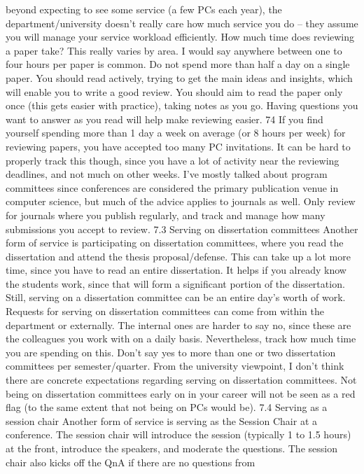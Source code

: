 \documentclass[oneside,11pt]{memoir}
\begin{document}
beyond expecting to see some service (a few PCs each year), the department/university doesn’t
really care how much service you do – they assume you will manage your service workload
efficiently.
How much time does reviewing a paper take? This really varies by area. I would say anywhere
between one to four hours per paper is common. Do not spend more than half a day on a single
paper. You should read actively, trying to get the main ideas and insights, which will enable you
to write a good review. You should aim to read the paper only once (this gets easier with
practice), taking notes as you go. Having questions you want to answer as you read will help
make reviewing easier.
74
If you find yourself spending more than 1 day a week on average (or 8 hours per week) for
reviewing papers, you have accepted too many PC invitations. It can be hard to properly track
this though, since you have a lot of activity near the reviewing deadlines, and not much on other
weeks.
I’ve mostly talked about program committees since conferences are considered the primary
publication venue in computer science, but much of the advice applies to journals as well. Only
review for journals where you publish regularly, and track and manage how many submissions
you accept to review.
7.3 Serving on dissertation committees
Another form of service is participating on dissertation committees, where you read the
dissertation and attend the thesis proposal/defense. This can take up a lot more time, since you
have to read an entire dissertation. It helps if you already know the students work, since that
will form a significant portion of the dissertation. Still, serving on a dissertation committee can
be an entire day’s worth of work.
Requests for serving on dissertation committees can come from within the department or
externally. The internal ones are harder to say no, since these are the colleagues you work with
on a daily basis. Nevertheless, track how much time you are spending on this. Don’t say yes to
more than one or two dissertation committees per semester/quarter.
From the university viewpoint, I don’t think there are concrete expectations regarding serving on
dissertation committees. Not being on dissertation committees early on in your career will not
be seen as a red flag (to the same extent that not being on PCs would be).
7.4 Serving as a session chair
Another form of service is serving as the Session Chair at a conference. The session chair will
introduce the session (typically 1 to 1.5 hours) at the front, introduce the speakers, and
moderate the questions. The session chair also kicks off the QnA if there are no questions from
\end{document}
